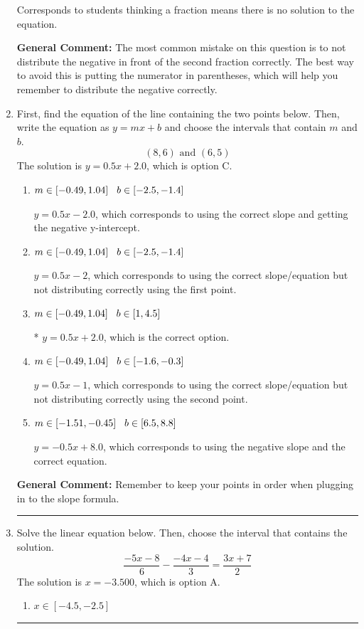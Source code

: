 \documentclass{extbook}[14pt]
\newcommand{\litem}[1]{\item #1

\rule{\textwidth}{0.4pt}}
\begin{document}
\begin{enumerate}
{\begin{enumerate}[label=\Alph*.]
Corresponds to students thinking a fraction means there is no solution to the equation.
\end{enumerate}

\textbf{General Comment:} The most common mistake on this question is to not distribute the negative in front of the second fraction correctly. The best way to avoid this is putting the numerator in parentheses, which will help you remember to distribute the negative correctly.
}
\litem{
First, find the equation of the line containing the two points below. Then, write the equation as $ y=mx+b $ and choose the intervals that contain $m$ and $b$.
\[ (8, 6) \text{ and } (6, 5) \]The solution is \( y = 0.5x + 2.0 \), which is option C.\begin{enumerate}[label=\Alph*.]
\item \( m \in [-0.49, 1.04] \hspace*{3mm} b \in [-2.5, -1.4] \)

 $y = 0.5x -2.0$, which corresponds to using the correct slope and getting the negative y-intercept.
\item \( m \in [-0.49, 1.04] \hspace*{3mm} b \in [-2.5, -1.4] \)

 $y = 0.5x -2$, which corresponds to using the correct slope/equation but not distributing correctly using the first point.
\item \( m \in [-0.49, 1.04] \hspace*{3mm} b \in [1, 4.5] \)

* $y = 0.5x + 2.0$, which is the correct option.
\item \( m \in [-0.49, 1.04] \hspace*{3mm} b \in [-1.6, -0.3] \)

 $y = 0.5x -1$, which corresponds to using the correct slope/equation but not distributing correctly using the second point.
\item \( m \in [-1.51, -0.45] \hspace*{3mm} b \in [6.5, 8.8] \)

 $y = -0.5x + 8.0$, which corresponds to using the negative slope and the correct equation.
\end{enumerate}

\textbf{General Comment:} Remember to keep your points in order when plugging in to the slope formula.
}
\litem{
Solve the linear equation below. Then, choose the interval that contains the solution.
\[ \frac{-5x -8}{6} - \frac{-4x -4}{3} = \frac{3x + 7}{2} \]The solution is \( x = -3.500 \), which is option A.\begin{enumerate}[label=\Alph*.]
\item \( x \in [-4.5, -2.5] \)


\end{enumerate}}
\end{enumerate}
\end{document}
